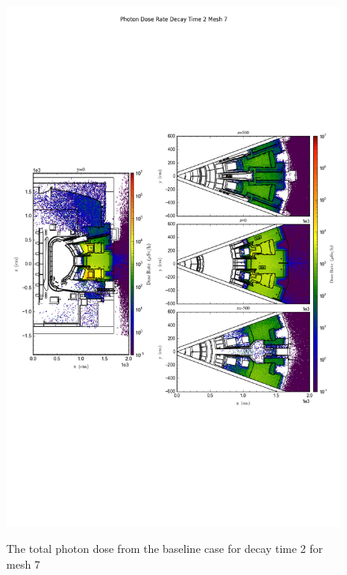 \begin{figure}[ht!]
\centering
\includegraphics[trim={0cm 9cm 0cm 10cm},clip,scale=0.75]{../plots/final_model/Photon_Dose_Rate_Decay_Time_2_Mesh_7.png}
\label{fig:photons_dc2_no4bc_m7_flux}
\caption{The total photon dose from the baseline case for decay time 2 for mesh 7}
\end{figure}
